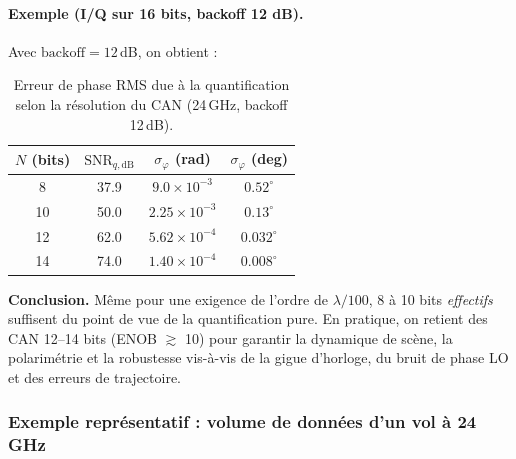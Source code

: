 \paragraph{Exemple (I/Q sur 16 bits, backoff 12 dB).}
Avec $\mathrm{backoff}=12$\,dB, on obtient :
\begin{table}[H]
\centering
\caption{Erreur de phase RMS due à la quantification selon la résolution du CAN (24\,GHz, backoff 12\,dB).}
\label{tab:bits_phase_24ghz}
\renewcommand{\arraystretch}{1.1}
\begin{tabular}{@{}cccc@{}}
\toprule
$N$ (bits) & $\mathrm{SNR}_{q,\mathrm{dB}}$ & $\sigma_\varphi$ (rad) & $\sigma_\varphi$ (deg) \\
\midrule
8  & 37.9 & $9.0\times10^{-3}$  & $0.52^\circ$ \\
10 & 50.0 & $2.25\times10^{-3}$ & $0.13^\circ$ \\
12 & 62.0 & $5.62\times10^{-4}$ & $0.032^\circ$ \\
14 & 74.0 & $1.40\times10^{-4}$ & $0.008^\circ$ \\
\bottomrule
\end{tabular}
\end{table}

\noindent\textbf{Conclusion.} Même pour une exigence de l’ordre de $\lambda/100$, 8 à 10 bits \emph{effectifs} suffisent du point de vue de la quantification pure. En pratique, on retient des CAN 12–14 bits (ENOB $\gtrsim$ 10) pour garantir la dynamique de scène, la polarimétrie et la robustesse vis-à-vis de la gigue d’horloge, du bruit de phase LO et des erreurs de trajectoire.

\vspace{1em}

\subsubsection{Exemple représentatif : volume de données d’un vol à 24\,GHz}

